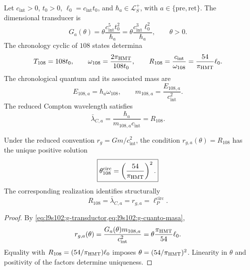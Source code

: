 Let \(c_{\mathrm{int}}>0\), \(t_0>0\),
\(\ell_0=c_{\mathrm{int}}t_0\), and
\(\hbar_a\in\mathcal L_S^+\), with
\(a\in\{\mathrm{pre},\mathrm{ret}\}\). The dimensional transducer is
\begin{equation}
 G_a(\theta)
 =\theta\frac{c_{\mathrm{int}}^5t_0^2}{\hbar_a}
 =\theta\frac{c_{\mathrm{int}}^3\ell_0^2}{\hbar_a},
 \qquad \theta>0.
 \label{eq:l9s102:g-transductor}
\end{equation}
The chronology cyclic of \(108\) states determina
\begin{equation}
 T_{108}=108t_0,
 \qquad
 \omega_{108}=\frac{2\pi_{\rm HMT}}{108t_0},
 \qquad
 R_{108}=\frac{c_{\mathrm{int}}}{\omega_{108}}
 =\frac{54}{\pi_{\rm HMT}}\ell_0.
 \label{eq:l9s102:g-reloj108}
\end{equation}
The chronological quantum and its associated mass are
\begin{equation}
 E_{108,a}=\hbar_a\omega_{108},
 \qquad
 m_{108,a}=\frac{E_{108,a}}{c_{\mathrm{int}}^2}.
 \label{eq:l9s102:g-cuanto-masa}
\end{equation}
The reduced Compton wavelength satisfies
\begin{equation}
 \bar\lambda_{C,a}
 =\frac{\hbar_a}{m_{108,a}c_{\mathrm{int}}}=R_{108}.
 \label{eq:l9s102:g-compton}
\end{equation}

\begin{theorem}
\label{thm:l9s102:g-selector}
Under the reduced convention \(r_g=Gm/c_{\mathrm{int}}^2\), the condition
\(r_{g,a}(\theta)=R_{108}\) has the unique positive solution
\begin{equation}
 \boxed{
 \theta_{108}^{\mathrm{circ}}=\left(\frac{54}{\pi_{\rm HMT}}\right)^2.}
 \label{eq:l9s102:g-theta}
\end{equation}
The corresponding realization identifies structurally
\begin{equation}
 R_{108}=\bar\lambda_{C,a}=r_{g,a}=\ell_P^{\mathrm{circ}}.
 \label{eq:l9s102:g-cuatro-longitudes}
\end{equation}
\end{theorem}

\begin{proof}
By \cref{eq:l9s102:g-transductor,eq:l9s102:g-cuanto-masa},
\[
 r_{g,a}(\theta)
 =\frac{G_a(\theta)m_{108,a}}{c_{\mathrm{int}}^2}
 =\theta\frac{\pi_{\rm HMT}}{54}\ell_0.
\]
Equality with \(R_{108}=(54/\pi_{\rm HMT})\ell_0\) imposes
\(\theta=(54/\pi_{\rm HMT})^2\). Linearity in \(\theta\) and positivity of
the factors determine uniqueness.
\end{proof}

